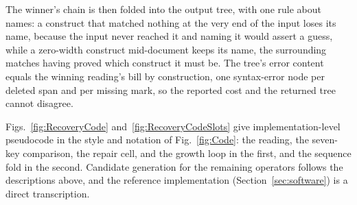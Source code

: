 \documentclass[manuscript]{acmart}
\begin{document}
The winner's chain is then folded into the output tree, with one rule about names: a construct that matched nothing at the very end of the input loses its name, because the input never reached it and naming it would assert a guess, while a zero-width construct mid-document keeps its name, the surrounding matches having proved which construct it must be. The tree's error content equals the winning reading's bill by construction, one syntax-error node per deleted span and per missing mark, so the reported cost and the returned tree cannot disagree.

Figs.~\ref{fig:RecoveryCode} and~\ref{fig:RecoveryCodeSlots} give implementation-level pseudocode in the style and notation of Fig.~\ref{fig:Code}: the reading, the seven-key comparison, the repair cell, and the growth loop in the first, and the sequence fold in the second. Candidate generation for the remaining operators follows the descriptions above, and the reference implementation (Section~\ref{sec:software}) is a direct transcription.
\end{document}
